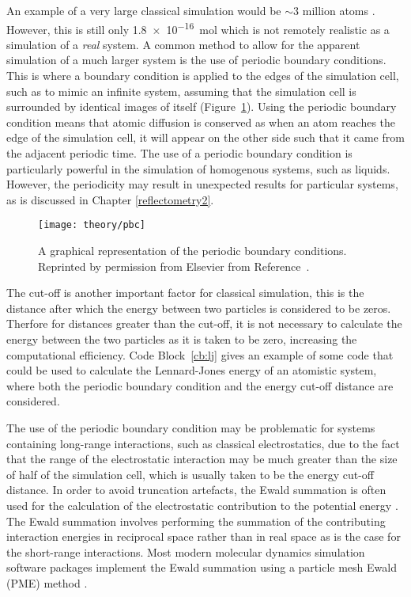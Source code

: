 An example of a very large classical simulation would be $\sim3$ million atoms \cite{gumbart_regulation_2009}.
However, this is still only \SI{1.8e-16}{\mol} which is not remotely realistic as a simulation of a \emph{real} system.
A common method to allow for the apparent simulation of a much larger system is the use of periodic boundary conditions.
This is where a boundary condition is applied to the edges of the simulation cell, such as to mimic an infinite system, assuming that the simulation cell is surrounded by identical images of itself (Figure~\ref{fig:pbc}).
Using the periodic boundary condition means that atomic diffusion is conserved as when an atom reaches the edge of the simulation cell, it will appear on the other side such that it came from the adjacent periodic time.
The use of a periodic boundary condition is particularly powerful in the simulation of homogenous systems, such as liquids.
However, the periodicity may result in unexpected results for particular systems, as is discussed in Chapter \ref{reflectometry2}.
%
\begin{figure}
    \centering
    \texttt{[image: theory/pbc]}
    \caption{A graphical representation of the periodic boundary conditions. Reprinted by permission from Elsevier\textsuperscript{\textcopyright} from Reference~\cite{frenkel_understanding_1996}.}
    \label{fig:pbc}
\end{figure}
%

The cut-off is another important factor for classical simulation, this is the distance after which the energy between two particles is considered to be zeros.
Therfore for distances greater than the cut-off, it is not necessary to calculate the energy between the two particles as it is taken to be zero, increasing the computational efficiency.
Code Block~\ref{cb:lj} gives an example of some code that could be used to calculate the Lennard-Jones energy of an atomistic system, where both the periodic boundary condition and the energy cut-off distance are considered.
%
\begin{figure}
    \centering
        
\end{figure}
%

The use of the periodic boundary condition may be problematic for systems containing long-range interactions, such as classical electrostatics, due to the fact that the range of the electrostatic interaction may be much greater than the size of half of the simulation cell, which is usually taken to be the energy cut-off distance.
In order to avoid truncation artefacts, the Ewald summation is often used for the calculation of the electrostatic contribution to the potential energy \cite{ewald_berechnung_1921}.
The Ewald summation involves performing the summation of the contributing interaction energies in reciprocal space rather than in real space as is the case for the short-range interactions.
Most modern molecular dynamics simulation software packages implement the Ewald summation using a particle mesh Ewald (PME) method \cite{essmann_smooth_1995}.

